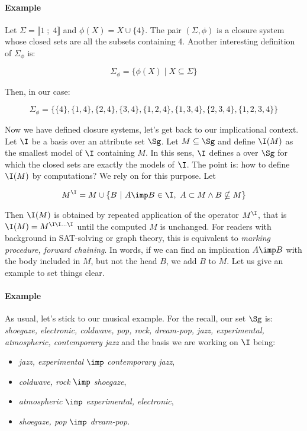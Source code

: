 \paragraph{Example} Let $\Sigma = \llbracket 1 \; ; \; 4 \rrbracket$ and 
$\phi(X) = X \cup \{4 \}$. The pair $(\Sigma, \phi)$ is a closure system whose
closed sets are all the subsets containing 4. Another interesting definition of 
$\Sigma_{\phi}$ is:

	\[ \Sigma_{\phi} = \{ \phi(X) \; | \; X \subseteq \Sigma \} \]

\noindent Then, in our case:

	\[ \Sigma_{\phi} = \{ \{ 4\}, \{ 1, 4\}, \{ 2, 4\},
		\{ 3, 4\}, \{ 1, 2, 4\}, \{ 1, 3, 4\},\{ 2, 3, 4\}, 
		\{ 1, 2, 3, 4\} \}
	\]

\vspace{1.2em}

\noindent Now we have defined closure systems, let's get back to our 
implicational context. Let $\I$ be a basis over an attribute set $\Sg$. Let $
M \subseteq \Sg$ and define $\I(M)$ as the smallest model of $\I$ containing 
$M$. In this sens, $\I$ defines a  over $\Sg$ for 
which the closed sets are exactly the models of $\I$. The point is: how to 
define $\I(M)$ by computations? We rely on \cite{b._ganter_conceptual_2016} for 
this purpose. Let 

	\[ M^{\I} = M \cup \{ B \ | \ A \imp B \in \I, \ A \subset M \land
			B \nsubseteq M \} 
	\]

\noindent Then $\I(M)$ is obtained by repeated application of the operator 
$M^{\I}$, that is $\I(M) = M^{\I \I \dots \I}$ until the computed $M$ is 
unchanged. For readers with background in SAT-solving or graph theory, this is
equivalent to \textit{marking procedure, forward chaining}. In words, if we can 
find an implication $A \imp B$
with the body included in $M$, but not the head $B$, we add $B$ to $M$. Let us 
give an 
example to set things clear.

\paragraph{Example} As usual, let's stick to our musical example. For the 
recall, our set $\Sg$ is: \textit{shoegaze, electronic, coldwave, pop, rock, 
dream-pop, jazz, experimental, atmospheric, contemporary jazz} and the basis
we are working on $\I$ being:
\begin{itemize}
	\item[ ] \textit{jazz, experimental} $\imp$ \textit{contemporary jazz},
	\item[ ] \textit{coldwave, rock}  $\imp$ \textit{shoegaze},
	\item[ ] \textit{atmospheric} $\imp$ \textit{experimental, electronic},
	\item[ ] \textit{shoegaze, pop} $\imp$ \textit{dream-pop}.
\end{itemize}

